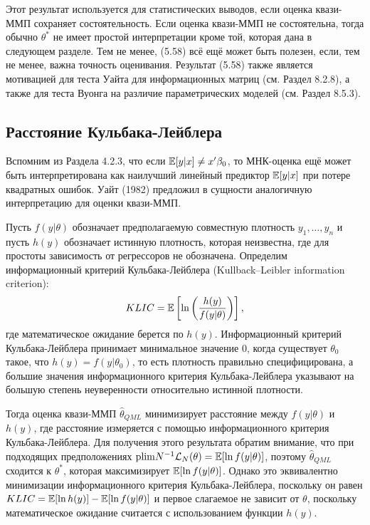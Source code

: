Этот результат используется для статистических выводов, если оценка квази-ММП сохраняет состоятельность. Если оценка квази-ММП не состоятельна, тогда обычно $\theta^*$ не имеет простой интерпретации кроме той, которая дана в следующем разделе. Тем не менее, (5.58) всё ещё может быть полезен, если, тем не менее, важна точность оценивания. Результат (5.58) также является мотивацией для теста Уайта для информационных матриц (см. Раздел 8.2.8), а также для теста Вуонга на различие параметрических моделей (см. Раздел 8.5.3).

\subsection{Расстояние Кульбака-Лейблера}

Вспомним из Раздела 4.2.3, что если $\mathbb{E}[y|x] \not = x' \beta_0$, то МНК-оценка ещё может быть интерпретирована как наилучший линейный предиктор $\mathbb{E}[y|x]$ при потере квадратных ошибок. Уайт (1982) предложил в сущности аналогичную интерпретацию для оценки квази-ММП.

Пусть $f(y|\theta)$ обозначает предполагаемую совместную плотность $y_1, \dots, y_n$ и пусть $h(y)$ обозначает истинную плотность, которая неизвестна, где для простоты зависимость от регрессоров не обозначена. Определим информационный критерий Кульбака-Лейблера (Kullback–Leibler information criterion):
\begin{equation}
KLIC = \mathbb{E} \left[ \ln \left( \frac{h(y)}{f(y|\theta)} \right) \right],
\end{equation}
где математическое ожидание берется по $h(y)$. Информационный критерий Кульбака-Лейблера принимает минимальное значение 0, когда существует $\theta_0$ такое, что $h(y)=f(y|\theta_0)$, то есть плотность правильно специфицирована, а большие значения информационного критерия Кульбака-Лейблера указывают на большую степень неуверенности относительно истинной плотности.

Тогда оценка квази-ММП $\hat{\theta}_{QML}$ минимизирует расстояние между $f(y|\theta)$ и $h(y)$, где расстояние измеряется с помощью информационного критерия Кульбака-Лейблера. Для получения этого результата обратим внимание, что при подходящих предположениях $\mathrm{plim } N^{-1} \mathcal{L}_{N}(\theta)=\mathbb{E}[\ln f(y|\theta)]$, поэтому $\hat{\theta}_{QML}$ сходится к $\theta^*$, которая максимизирует $\mathbb{E}[\ln f(y|\theta)]$. Однако это эквивалентно минимизации информационного критерия Кульбака-Лейблера, поскольку он равен $KLIC=\mathbb{E}[\ln h(y)]-\mathbb{E}[\ln f(y|\theta)]$ и первое слагаемое не зависит от $\theta$, поскольку математическое ожидание считается с использованием функции $h(y)$.

